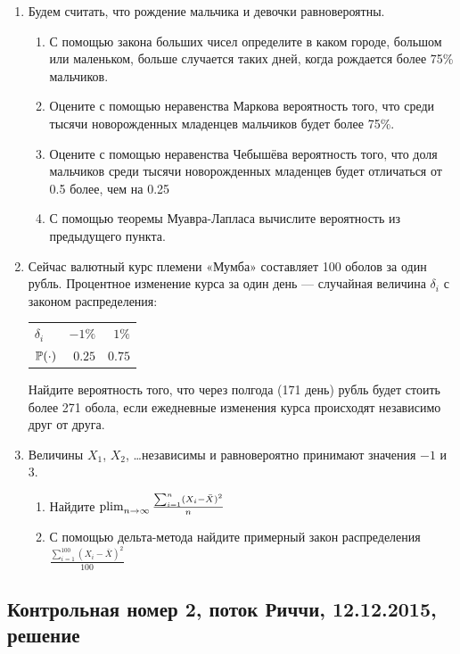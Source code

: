 \begin{enumerate}
\item Будем считать, что рождение мальчика и девочки равновероятны.
\begin{enumerate}
\item С помощью закона больших чисел определите в каком городе, большом или маленьком, больше случается таких дней, когда рождается более 75\% мальчиков.
\item Оцените с помощью неравенства Маркова вероятность того, что среди тысячи новорожденных младенцев мальчиков будет более 75\%.
\item Оцените с помощью неравенства Чебышёва вероятность того, что доля мальчиков среди тысячи новорожденных младенцев будет отличаться от 0.5 более, чем на 0.25
\item С помощью теоремы Муавра-Лапласа вычислите вероятность из предыдущего пункта.
\end{enumerate}

\item Сейчас валютный курс племени «Мумба» составляет 100 оболов за один рубль. Процентное изменение курса за один день — случайная величина $\delta_i$ с законом распределения:

\begin{center}
\begin{tabular}{lrr}
\toprule
$\delta_i$ & $-1\%$  & $1\%$ \\
$\P(\cdot)$ & $0.25$  & $0.75$ \\
\bottomrule
\end{tabular}
\end{center}

Найдите вероятность того, что через полгода (171 день) рубль будет стоить более 271 обола, если ежедневные изменения курса происходят независимо друг от друга.

\item Величины $X_1$, $X_2$, \ldots независимы и равновероятно принимают значения $-1$ и $3$.
\begin{enumerate}
\item Найдите $\plim_{n\to\infty} \frac{\sum_{i=1}^n(X_i-\bar X)^2}{n}$
\item С помощью дельта-метода найдите примерный закон распределения $\frac{\sum_{i=1}^{100}(X_i-\bar X)^2}{100}$
\end{enumerate}

\end{enumerate}

\subsection{Контрольная номер 2, поток Риччи, 12.12.2015, решение}

